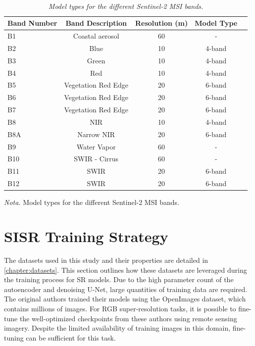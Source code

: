 \begin{table}[H]
    \caption{\doublespacing \\ \textit{Model types for the different Sentinel-2 MSI bands.}}
    \begin{spacing}{8}
        \fontsize{8pt}{2pt}\selectfont  
        \begin{tabularx}{\linewidth}{P{6cm}*{4}{c}} 
            \toprule
            \textbf{Band Number} & \textbf{Band Description} & \textbf{Resolution (m)} & \textbf{Model Type} \\
            \midrule
            B1 & Coastal aerosol & 60 & - \\
            B2 & Blue & 10 & 4-band \\
            B3 & Green & 10 & 4-band \\
            B4 & Red & 10 & 4-band \\
            B5 & Vegetation Red Edge & 20 & 6-band \\
            B6 & Vegetation Red Edge & 20 & 6-band \\
            B7 & Vegetation Red Edge & 20 & 6-band \\
            B8 & NIR & 10 & 4-band \\
            B8A & Narrow NIR & 20 & 6-band \\
            B9 & Water Vapor & 60 & - \\
            B10 & SWIR - Cirrus & 60 & - \\
            B11 & SWIR & 20 & 6-band \\
            B12 & SWIR & 20 & 6-band \\
            \bottomrule
        \end{tabularx}
    \end{spacing}
    \vspace{1\baselineskip}
    \textit{Nota.} Model types for the different Sentinel-2 MSI bands.
    \label{table:sentinel2_bands_model}
\end{table}


\section{SISR Training Strategy}
The datasets used in this study and their properties are detailed in \autoref{chapter:datasets}. This section outlines how these datasets are leveraged during the training process for SR models. Due to the high parameter count of the autoencoder and denoising U-Net, large quantities of training data are required. The original authors \autocite{rombach2022highresolution} trained their models using the OpenImages dataset, which contains millions of images. For RGB super-resolution tasks, it is possible to fine-tune the well-optimized checkpoints from these authors using remote sensing imagery. Despite the limited availability of training images in this domain, fine-tuning can be sufficient for this task.

